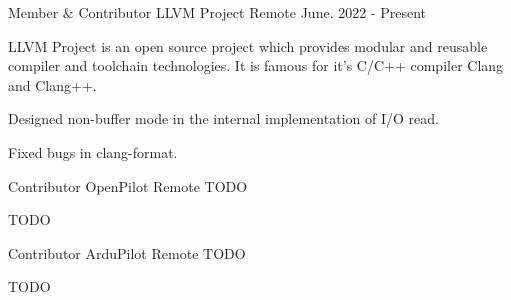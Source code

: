 

\begin{cventries}


  \cventry
    {Member \& Contributor} %
    {LLVM Project} %
    {Remote} %
    {June. 2022 - Present} %
    {
      \begin{cvitems} %
        \item {LLVM Project is an open source project which provides modular and reusable compiler and toolchain technologies. It is famous for it's C/C++ compiler Clang and Clang++.}
        \item {Designed non-buffer mode in the internal implementation of I/O read.}
        \item {Fixed bugs in clang-format.}
      \end{cvitems}
    }

  \cventry
    {Contributor} %
    {OpenPilot} %
    {Remote} %
    {TODO} %
    {
      \begin{cvitems} %
        \item {TODO}
      \end{cvitems}
    }

  \cventry
    {Contributor} %
    {ArduPilot} %
    {Remote} %
    {TODO} %
    {
      \begin{cvitems} %
        \item {TODO}
      \end{cvitems}
    }


\end{cventries}
